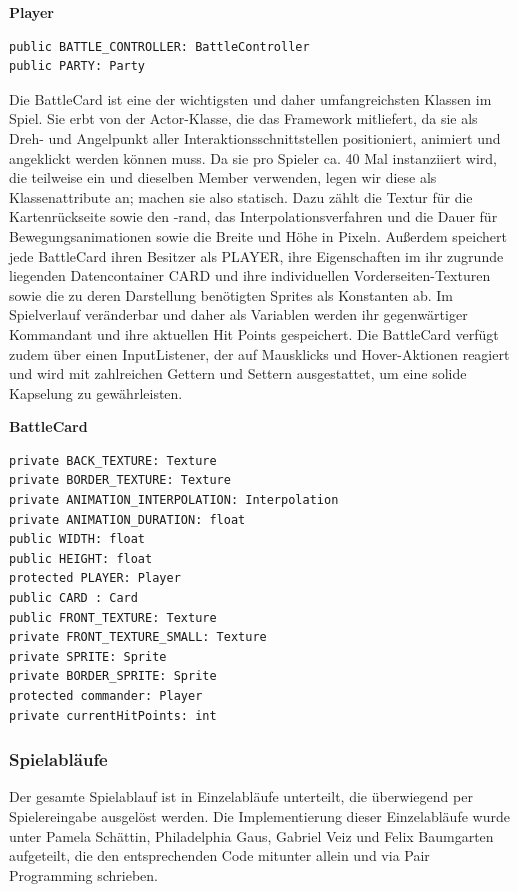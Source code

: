 \textbf{Player}
\begin{lstlisting}[frame=single]
public BATTLE_CONTROLLER: BattleController
public PARTY: Party
\end{lstlisting}

Die BattleCard ist eine der wichtigsten und daher umfangreichsten Klassen im Spiel. Sie erbt von der Actor-Klasse, die das Framework mitliefert, da sie als Dreh- und Angelpunkt aller Interaktionsschnittstellen positioniert, animiert und angeklickt werden können muss. Da sie pro Spieler ca. 40 Mal instanziiert wird, die teilweise ein und dieselben Member verwenden, legen wir diese als Klassenattribute an; machen sie also statisch. Dazu zählt die Textur für die Kartenrückseite sowie den -rand, das Interpolationsverfahren und die Dauer für Bewegungsanimationen sowie die Breite und Höhe in Pixeln. Außerdem speichert jede BattleCard ihren Besitzer als PLAYER, ihre Eigenschaften im ihr zugrunde liegenden Datencontainer CARD und ihre individuellen Vorderseiten-Texturen sowie die zu deren Darstellung benötigten Sprites als Konstanten ab. Im Spielverlauf veränderbar und daher als Variablen werden ihr gegenwärtiger Kommandant und ihre aktuellen Hit Points gespeichert. Die BattleCard verfügt zudem über einen InputListener, der auf Mausklicks und Hover-Aktionen reagiert und wird mit zahlreichen Gettern und Settern ausgestattet, um eine solide Kapselung zu gewährleisten.

\textbf{BattleCard}
\begin{lstlisting}[frame=single]
private BACK_TEXTURE: Texture
private BORDER_TEXTURE: Texture
private ANIMATION_INTERPOLATION: Interpolation
private ANIMATION_DURATION: float
public WIDTH: float
public HEIGHT: float
protected PLAYER: Player
public CARD : Card
public FRONT_TEXTURE: Texture
private FRONT_TEXTURE_SMALL: Texture
private SPRITE: Sprite
private BORDER_SPRITE: Sprite
protected commander: Player
private currentHitPoints: int
\end{lstlisting}

\subsubsection{Spielabläufe}
Der gesamte Spielablauf ist in Einzelabläufe unterteilt, die überwiegend per Spielereingabe ausgelöst werden. Die Implementierung dieser Einzelabläufe wurde unter Pamela Schättin, Philadelphia Gaus, Gabriel Veiz und Felix Baumgarten aufgeteilt, die den entsprechenden Code mitunter allein und via Pair Programming schrieben.

